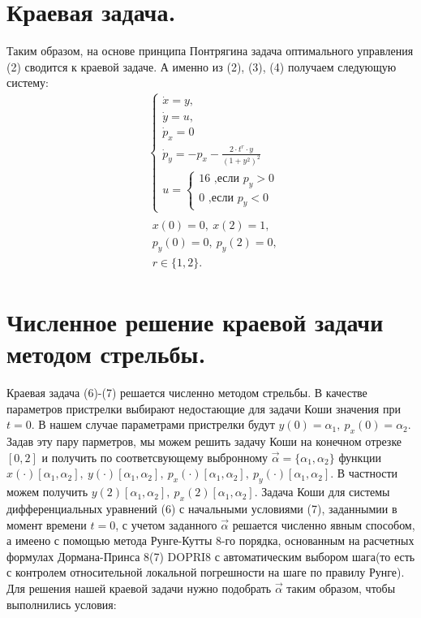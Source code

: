 \documentclass[a4paper,12pt]{article}
\begin{document}
\section{Краевая задача.}
Таким образом, на основе принципа Понтрягина задача оптимального управления (2) сводится к краевой задаче. А именно из (2), (3), (4) получаем следующую систему:
\begin{align}
    &\left\{
        \begin{array}{l}
            \dot x =y,\\
            \dot y= u,\\
            \dot p_x= 0\\
            \dot p_y= -p_x -\frac{2\cdot t^r \cdot y}{{(1+y^2)}^2}\\
            u=\left\{
            \begin{array}{l}
                16 \text{ ,если } p_y>0 \\
                0 \text{ ,если } p_y<0
            \end{array}
            \right.
        \end{array}
    \right.
    \\
    &\begin{array}{l}
        x(0)=0, \: x(2)=1,\\
        p_y(0)=0, \: p_y(2)=0,\\
        r \in \{1, 2\}.
    \end{array}
\end{align}





\section{Численное решение краевой задачи методом стрельбы.}
Краевая задача (6)-(7) решается численно методом стрельбы. В качестве параметров пристрелки выбирают недостающие для задачи Коши значения при $t=0$. В нашем случае параметрами пристрелки будут $y(0)=\alpha_1,\:p_x(0)=\alpha_2$. Задав эту пару парметров, мы можем решить задачу Коши на конечном отрезке $\left[0,2\right]$ и получить по соответсвующему выбронному $\overrightarrow{\alpha}=\{\alpha_1,\alpha_2\} $ функции 
$
x(\cdot)\left[\alpha_1,\alpha_2\right],\:
y(\cdot)\left[\alpha_1,\alpha_2\right],\:
p_x(\cdot)\left[\alpha_1,\alpha_2\right],\:
p_y(\cdot)\left[\alpha_1,\alpha_2\right]
$. В частности можем получить 
$
y(2)\left[\alpha_1,\alpha_2\right],\:
p_x(2)\left[\alpha_1,\alpha_2\right]
$.
Задача Коши для системы дифференциальных уравнений (6) с начальными условиями (7), заданнымии в момент времени $t=0$, с учетом заданного $\overrightarrow{\alpha}$ решается численно явным способом, а имеено с помощью метода Рунге-Кутты 8-го порядка, основанным на расчетных формулах Дормана-Принса 8(7) DOPRI8 с автоматическим выбором шага(то есть с контролем относительной локальной погрешности на шаге по правилу Рунге). Для решения нашей краевой задачи нужно подобрать $\overrightarrow{\alpha}$ таким образом, чтобы выполнились условия:
\end{document}
